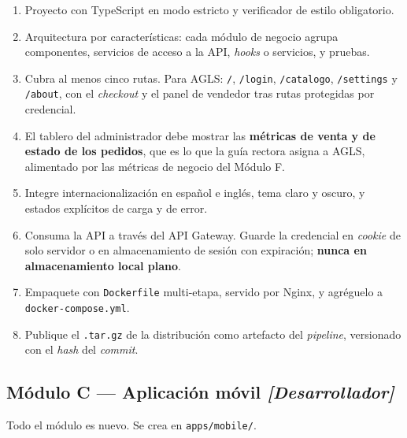 \documentclass[11pt,a4paper]{article}
\begin{document}
\begin{enumerate}[leftmargin=*,itemsep=3pt]
	\item Proyecto con TypeScript en modo estricto y verificador de estilo obligatorio.
	\item Arquitectura por características: cada módulo de negocio agrupa componentes, servicios de acceso a la API, \emph{hooks} o servicios, y pruebas.
	\item Cubra al menos cinco rutas. Para AGLS: \texttt{/}, \texttt{/login}, \texttt{/catalogo}, \texttt{/settings} y \texttt{/about}, con el \emph{checkout} y el panel de vendedor tras rutas protegidas por credencial.
	\item El tablero del administrador debe mostrar las \textbf{métricas de venta y de estado de los pedidos}, que es lo que la guía rectora asigna a AGLS, alimentado por las métricas de negocio del Módulo F.
	\item Integre internacionalización en español e inglés, tema claro y oscuro, y estados explícitos de carga y de error.
	\item Consuma la API a través del API Gateway. Guarde la credencial en \emph{cookie} de solo servidor o en almacenamiento de sesión con expiración; \textbf{nunca en almacenamiento local plano}.
	\item Empaquete con \texttt{Dockerfile} multi-etapa, servido por Nginx, y agréguelo a \texttt{docker-compose.yml}.
	\item Publique el \texttt{.tar.gz} de la distribución como artefacto del \emph{pipeline}, versionado con el \emph{hash} del \emph{commit}.
\end{enumerate}

\subsection{Módulo C --- Aplicación móvil \emph{[Desarrollador]}}

Todo el módulo es nuevo. Se crea en \texttt{apps/mobile/}.
\end{document}
